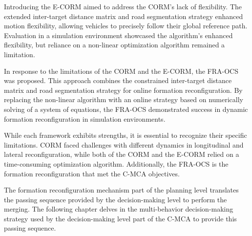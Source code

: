 Introducing the E-CORM aimed to address the CORM's lack of flexibility. The extended inter-target distance matrix and road segmentation strategy enhanced motion flexibility, allowing vehicles to precisely follow their global reference path. Evaluation in a simulation environment showcased the algorithm's enhanced flexibility, but reliance on a non-linear optimization algorithm remained a limitation. 

In response to the limitations of the CORM and the E-CORM, the FRA-OCS was proposed. This approach combines the constrained inter-target distance matrix and road segmentation strategy for online formation reconfiguration. By replacing the non-linear algorithm with an online strategy based on numerically solving of a system of equations, the FRA-OCS demonstrated success in dynamic formation reconfiguration in simulation environments. 


While each framework exhibits strengths, it is essential to recognize their specific limitations. CORM faced challenges with different dynamics in longitudinal and lateral reconfiguration, while both of the CORM and the E-CORM relied on a time-consuming optimization algorithm. Additionally, the FRA-OCS is the formation reconfiguration that met the C-MCA objectives. 

The formation reconfiguration mechanism part of the planning level translates the passing sequence provided by the decision-making level to perform the merging. The following chapter delves in the multi-behavior decision-making strategy used by the decision-making level part of the C-MCA to provide this passing sequence. 